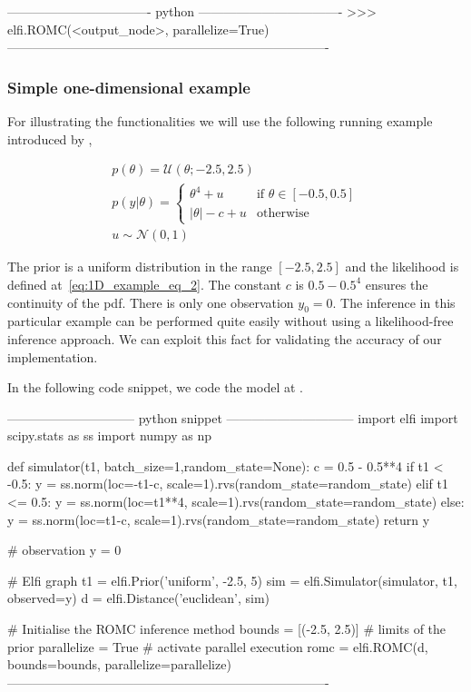\begin{Code}
---------------------------------- python ----------------------------------
>>> elfi.ROMC(<output_node>, parallelize=True)
----------------------------------------------------------------------------
\end{Code}
  
\subsubsection*{Simple one-dimensional example}

For illustrating the functionalities we will use the following running
example introduced by \citet{Ikonomov2019},

\begin{gather} \label{eq:1D_example}
  p(\theta) = \mathcal{U}(\theta;-2.5,2.5)\\ \label{eq:1D_example_eq_2}
  p(y|\theta) = \left\{
    \begin{array}{ll} \theta^4 + u & \mbox{if } \theta \in [-0.5, 0.5]
\\ |\theta| - c + u & \mbox{otherwise}
    \end{array} \right.\\ 
  u \sim \mathcal{N}(0,1)
\end{gather}

\noindent

The prior is a uniform distribution in the range \([-2.5, 2.5]\) and
the likelihood is defined at~\ref{eq:1D_example_eq_2}. The constant
\(c\) is \(0.5 - 0.5^4\) ensures the continuity of the pdf. There is
only one observation \(y_0 = 0\). The inference in this particular
example can be performed quite easily without using a likelihood-free
inference approach. We can exploit this fact for validating the
accuracy of our implementation.

In the following code snippet, we code the model at .

\begin{Code}
------------------------------ python snippet ------------------------------
  import elfi
  import scipy.stats as ss
  import numpy as np

  def simulator(t1, batch_size=1,random_state=None):
    c = 0.5 - 0.5**4
    if t1 < -0.5:
        y = ss.norm(loc=-t1-c, scale=1).rvs(random_state=random_state)
    elif t1 <= 0.5:
        y = ss.norm(loc=t1**4, scale=1).rvs(random_state=random_state)
    else:
        y = ss.norm(loc=t1-c, scale=1).rvs(random_state=random_state)
    return y

  # observation
  y = 0

  # Elfi graph
  t1 = elfi.Prior('uniform', -2.5, 5)
  sim = elfi.Simulator(simulator, t1, observed=y)
  d = elfi.Distance('euclidean', sim)

  # Initialise the ROMC inference method
  bounds = [(-2.5, 2.5)] # limits of the prior
  parallelize = True # activate parallel execution
  romc = elfi.ROMC(d, bounds=bounds, parallelize=parallelize)
----------------------------------------------------------------------------
\end{Code}
